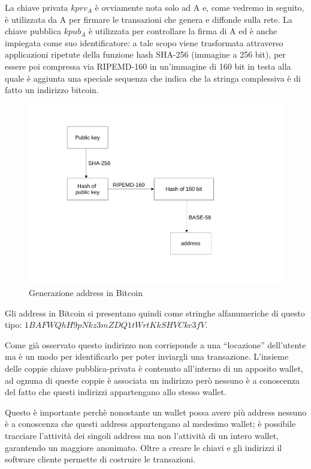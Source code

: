 La chiave privata $kprv_A$ è ovviamente nota solo ad A e, come vedremo in seguito, è utilizzata da A per ﬁrmare le transazioni che genera e diffonde sulla rete. La chiave pubblica $kpub_A$ è utilizzata per controllare la ﬁrma di A ed è anche impiegata come suo identiﬁcatore: a tale scopo viene trasformata attraverso applicazioni ripetute della funzione hash SHA-256 (immagine a 256 bit), per essere poi compressa via RIPEMD-160 in un’immagine di 160 bit in testa alla quale è aggiunta una speciale sequenza che indica che la stringa complessiva è di fatto un indirizzo bitcoin.
\begin{figure}[h!]
    \centering
    \includegraphics[scale=0.5, trim = 1cm 2cm 0cm 2cm, clip]{Images/address_gen.pdf}
    \caption{Generazione address in Bitcoin}
    \label{fig:sha-256_address}
\end{figure}
\FloatBarrier
Gli address in Bitcoin si presentano quindi come stringhe alfanumeriche di questo tipo: $1BAFWQhH9pNkz3mZDQ1tWrtKkSHVCkc3fV$.

Come già osservato questo indirizzo non corrisponde a una “locazione” dell'utente ma è un modo per identiﬁcarlo per poter inviargli una transazione. L'insieme delle coppie chiave pubblica-privata è contenuto all'interno di un apposito wallet, ad ognuna di queste coppie è associata un indirizzo però nessuno è a conoscenza del fatto che questi indirizzi appartengano allo stesso wallet.

Questo è importante perchè nonostante un wallet possa avere più address nessuno è a conoscenza che questi address appartengano al medesimo wallet; è possibile tracciare l’attività dei singoli address ma non l’attività di un intero wallet, garantendo un maggiore anonimato. Oltre a creare le chiavi e gli indirizzi il software cliente permette di costruire le transazioni.

